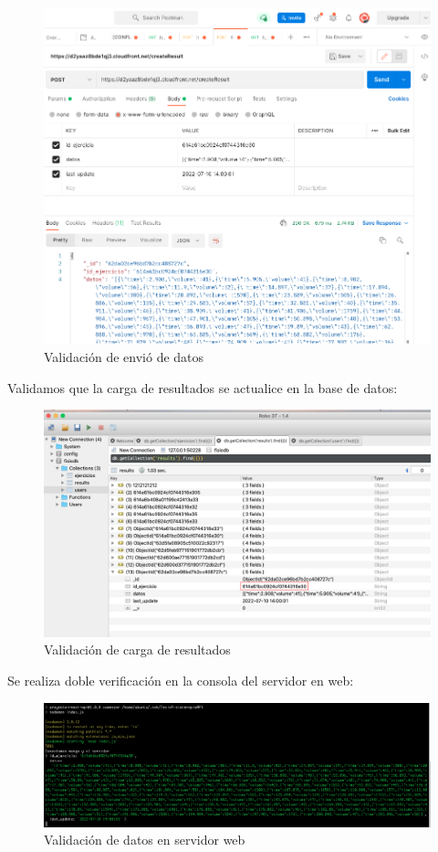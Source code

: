 \documentclass[12pt]{article}
\begin{document}
\begin{figure}[ht]
\centering
\includegraphics[scale=0.3]{imag/TEST3sendData.png}
\caption{Validación de envió de datos}
\label{6}
\end{figure}
\FloatBarrier

Validamos que la carga de resultados se actualice en la base de datos:

\begin{figure}[ht]
\centering
\includegraphics[scale=0.3]{imag/TEST4Results.png}
\caption{Validación de carga de resultados }
\label{6}
\end{figure}
\FloatBarrier

Se realiza doble verificación en la consola del servidor en web:

\begin{figure}[ht]
\centering
\includegraphics[scale=0.3]{imag/TEST5Console.png}
\caption{Validación de datos en servidor web}
\label{6}
\end{figure}
\FloatBarrier
\end{document}

